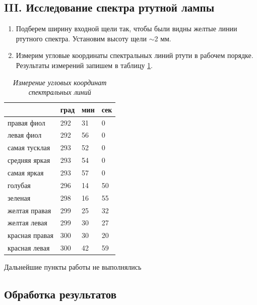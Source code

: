 \documentclass[a4paper,12pt]{article}
\begin{document}
\subsection*{III. Исследование спектра ртутной лампы}

\begin{enumerate}[resume]
    \item Подберем ширину входной щели так, чтобы были видны желтые линии ртутного спектра. Установим высоту щели $\sim$2 мм.
    \item Измерим угловые координаты спектральных линий ртути в рабочем порядке. Результаты измерений запишем в таблицу \ref{table:1}.
\end{enumerate}

\FloatBarrier
\begin{table}[!ht]
    \centering
    \caption{\textit{Измерение угловых координат спектральных линий}}
    \begin{tabular}{|l|l|l|l|}
        \hline
                       & град & мин & сек \\ \hline
        правая фиол    & 292  & 31  & 0   \\ \hline
        левая фиол     & 292  & 56  & 0   \\ \hline
        самая тусклая  & 293  & 52  & 0   \\ \hline
        средняя яркая  & 293  & 54  & 0   \\ \hline
        самая яркая    & 293  & 57  & 0   \\ \hline
        голубая        & 296  & 14  & 50  \\ \hline
        зеленая        & 298  & 16  & 55  \\ \hline
        желтая правая  & 299  & 25  & 32  \\ \hline
        желтая левая    & 299  & 30  & 27  \\ \hline
        красная правая & 300  & 30  & 20  \\ \hline
        красная левая  & 300  & 42  & 59  \\ \hline
    \end{tabular}
    \label{table:1}
\end{table}
\FloatBarrier

Дальнейшие пункты работы не выполнялись

\subsection*{Обработка результатов}
\end{document}
